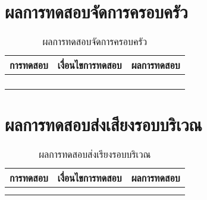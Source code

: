 \section{ผลการทดสอบจัดการครอบครัว}
\begin{table}[H]
	\caption{ผลการทดสอบจัดการครอบครัว}
    \centering	
	\label{tab:test11}
    \begin{tabular}{ | p{4cm} | p{4cm} | p{4cm} |  }
		\hline
	\multicolumn{1}{|c|}{การทดสอบ} & \multicolumn{1}{c|}{เงื่อนไขการทดสอบ} & \multicolumn{1}{c|}{ผลการทดสอบ}  \\ \hline
	\setstretch{1.0}{ทดสอบเพิ่มสมาชิกในครอบครัว}
	& \setstretch{1.0}{ผู้ใช้ไม่ได้เป็นสมาชิกในครอบครัว และกดเพิ่มสมาชิก}
	& \setstretch{1.0}{ระบบแสดงข้อความว่า  เพิ่มสมาชิกเรียบร้อย } \\ \cline{2-3} 
	& \setstretch{1.0}{ผู้ใช้เป็นสมาชิกในครอบครัว และกดเพิ่มสมาชิก}
	& \setstretch{1.0}{ระบบแสดงข้อความว่า  เป็นสมาชิกในครอบครัวอยู่แล้ว } \\ \hline
	\setstretch{1.0}{ทดสอบการลบสมาชิกในครอบครัว}
	& \setstretch{1.0}{ผู้ใช้เลือกปุ่มลบสมาชิกในครอบครัว}
	& \setstretch{1.0}{ระบบลบสมาชิกในครอบครัวและแสดงข้อความ  ลบสมาชิกเรียบร้อยแล้ว } \\ \cline{2-3} 
	& \setstretch{1.0}{ผู้ใช้ไม่เลือกลบตำแหน่งสมาชิกในครอบครัว}
	& \setstretch{1.0}{ระบบจะกลับไปยังหน้าแสดงสมาชิกในครอบครัว } \\ \hline
    \end{tabular}
\end{table}

\section{ผลการทดสอบส่งเสียงรอบบริเวณ}
\begin{table}[H]
	\caption{ผลการทดสอบส่งเรียงรอบบริเวณ}
    \centering	
	\label{tab:test13}
    \begin{tabular}{ | p{4cm} | p{4cm} | p{4cm} |  }
		\hline
	\multicolumn{1}{|c|}{การทดสอบ} & \multicolumn{1}{c|}{เงื่อนไขการทดสอบ} & \multicolumn{1}{c|}{ผลการทดสอบ}\\ \hline
	\setstretch{1.0}{ทดสอบแสดงส่งเรียงรอบบริเวณ}
	& \setstretch{1.0}{ผู้ใช้เลือกเมนูส่งเรียงรอบบริเวณ}
	& \setstretch{1.0}{ระบบส่งเสียงไซเรนรอบบริเวณ} \\ \cline{2-3} 
	& \setstretch{1.0}{ผู้ใช้เลือกปุ่มหยุดการเสียงรอบบริเวณ}
	& \setstretch{1.0}{ระบบจะหยุดการส่งเสียงรอบบริเวณ } \\ \hline
    \end{tabular}
\end{table}

